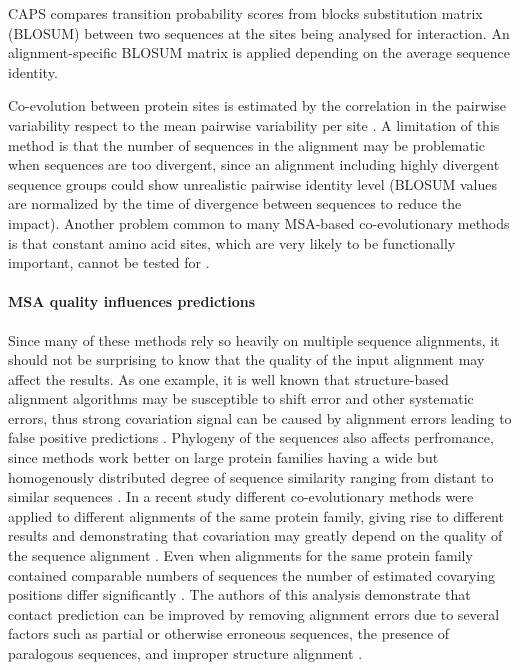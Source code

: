 CAPS \cite{fares2006novel} compares transition probability scores from blocks substitution matrix (BLOSUM) between two sequences at the sites being analysed for interaction.
An alignment-specific BLOSUM matrix is applied depending on the average sequence identity.

Co-evolution between protein sites is estimated by the correlation in the pairwise variability respect to the mean pairwise variability per site \cite{fares2006novel}.
A limitation of this method is that the number of sequences in the alignment may be problematic when sequences are too divergent, since an alignment including highly divergent sequence groups could show unrealistic pairwise identity level (BLOSUM values are normalized by the time of divergence between sequences to reduce the impact).
Another problem common to many MSA-based co-evolutionary methods is that constant amino acid sites, which are very likely to be functionally important, cannot be tested for  \cite{fares2006novel}.

\paragraph{MSA quality influences predictions}
Since many of these methods rely so heavily on multiple sequence alignments, it should not be surprising to know that the quality of the input alignment may affect the results.
As one example, it is well known that structure-based alignment algorithms may be susceptible to shift error and other systematic errors, thus strong covariation signal can be caused by alignment errors leading to false positive predictions \cite{dickson2010identifying}.
Phylogeny of the sequences also affects perfromance, since methods work better on large protein families having a wide but homogenously distributed degree of sequence similarity ranging from distant to similar sequences \cite{de2013emerging}.
In a recent study different co-evolutionary methods were applied to different alignments of the same protein family, giving rise to different results and demonstrating that covariation may greatly depend on the quality of the sequence alignment \cite{dickson2010identifying}.
Even when alignments for the same protein family contained comparable numbers of sequences the number of estimated covarying positions differ significantly \cite{dickson2010identifying}.
The authors of this analysis demonstrate that contact prediction can be improved by removing alignment errors due to several factors such as partial or otherwise erroneous sequences, the presence of paralogous sequences, and improper structure alignment \cite{dickson2010identifying}.

